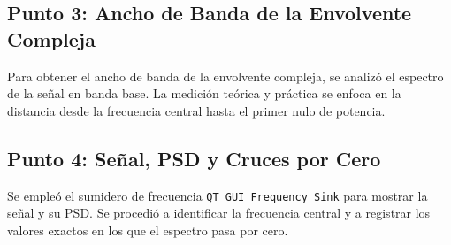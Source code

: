 \subsection*{Punto 3: Ancho de Banda de la Envolvente Compleja}
Para obtener el ancho de banda de la envolvente compleja, se analizó el espectro de la señal en banda base. La medición teórica y práctica se enfoca en la distancia desde la frecuencia central hasta el primer nulo de potencia.
\subsection*{Punto 4: Señal, PSD y Cruces por Cero}

Se empleó el sumidero de frecuencia \texttt{QT GUI Frequency Sink} para mostrar la señal y su PSD. Se procedió a identificar la frecuencia central y a registrar los valores exactos en los que el espectro pasa por cero.



